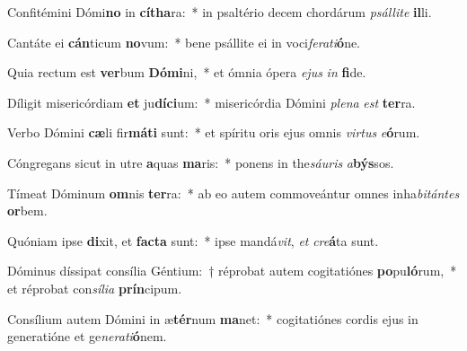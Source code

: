 \item Confitémini Dómi\textbf{no} in \textbf{cí}\textbf{tha}ra:~* in psaltério decem chordárum \textit{psál}\textit{li}\textit{te} \textbf{il}li.
\item Cantáte ei \textbf{cán}ticum \textbf{no}vum:~* bene psállite ei in voci\textit{fe}\textit{ra}\textit{ti}\textbf{ó}ne.
\item Quia rectum est \textbf{ver}bum \textbf{Dó}\textbf{mi}ni,~* et ómnia ópera \textit{e}\textit{jus} \textit{in} \textbf{fi}de.
\item Díligit misericórdiam \textbf{et} ju\textbf{dí}\textbf{ci}um:~* misericórdia Dómini \textit{ple}\textit{na} \textit{est} \textbf{ter}ra.
\item Verbo Dómini \textbf{cæ}li fir\textbf{má}\textbf{ti} sunt:~* et spíritu oris ejus omnis \textit{vir}\textit{tus} \textit{e}\textbf{ó}rum.
\item Cóngregans sicut in utre \textbf{a}quas \textbf{ma}ris:~* ponens in the\textit{sáu}\textit{ris} \textit{a}\textbf{býs}sos.
\item Tímeat Dóminum \textbf{om}nis \textbf{ter}ra:~* ab eo autem commoveántur omnes inha\textit{bi}\textit{tán}\textit{tes} \textbf{or}bem.
\item Quóniam ipse \textbf{di}xit, et \textbf{fac}\textbf{ta} sunt:~* ipse mandá\textit{vit}, \textit{et} \textit{cre}\textbf{á}ta sunt.
\item Dóminus díssipat consília Géntium:~† réprobat autem cogitatiónes \textbf{po}pu\textbf{ló}rum,~* et réprobat con\textit{sí}\textit{li}\textit{a} \textbf{prín}cipum.
\item Consílium autem Dómini in æ\textbf{tér}num \textbf{ma}net:~* cogitatiónes cordis ejus in generatióne et ge\textit{ne}\textit{ra}\textit{ti}\textbf{ó}nem.
